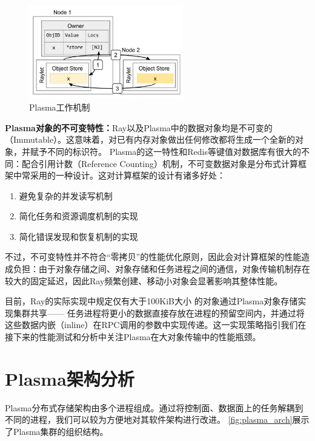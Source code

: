\begin{figure}[h] 
    \centering
    \includegraphics[width=0.6\textwidth]{image/chap02/object_fetch.png}
    \caption{Plasma工作机制}
    \label{fig:object_fetch}
\end{figure}

\textbf{Plasma对象的不可变特性：}Ray以及Plasma中的数据对象均是不可变的（Immutable）。这意味着，对已有内存对象做出任何修改都将生成一个全新的对象，并赋予不同的标识符。
Plasma的这一特性和Redis等键值对数据库有很大的不同：配合引用计数（Reference Counting）机制，不可变数据对象是分布式计算框架中常采用的一种设计。这对计算框架的设计有诸多好处：

\begin{enumerate}
    \item 避免复杂的并发读写机制
    \item 简化任务和资源调度机制的实现
    \item 简化错误发现和恢复机制的实现
\end{enumerate}

不过，不可变特性并不符合“零拷贝”的性能优化原则，因此会对计算框架的性能造成负担：由于对象存储之间、对象存储和任务进程之间的通信，对象传输机制存在较大的固定延迟，因此Ray频繁创建、移动小对象会显著影响其整体性能。

目前，Ray的实际实现中规定仅有大于100KiB大小
\cite{ray_whitepaper}的对象通过Plasma对象存储实现集群共享——
任务进程将更小的数据直接存放在进程的预留空间内，并通过将这些数据内嵌（inline）在RPC调用的参数中实现传递。这一实现策略指引我们在接下来的性能测试和分析中关注Plasma在大对象传输中的性能瓶颈。

\section{Plasma架构分析}

Plasma分布式存储架构由多个进程组成。通过将控制面、数据面上的任务解耦到不同的进程，我们可以较为方便地对其软件架构进行改进。
\autoref{fig:plasma_arch}展示了Plasma集群的组织结构。

